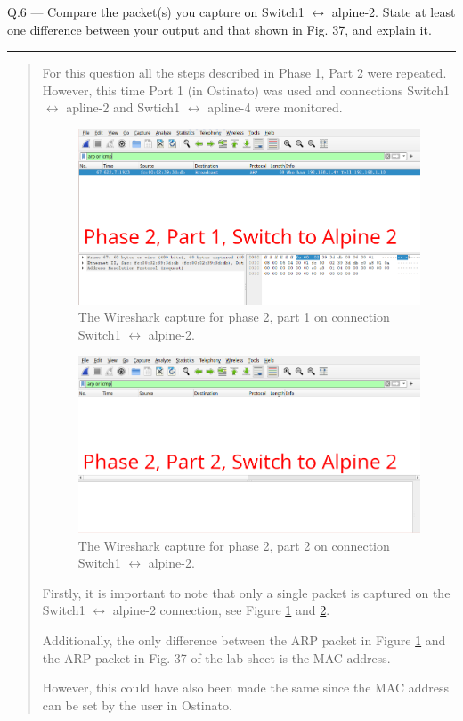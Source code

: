 \documentclass{article}
\newcommand\Que[2]{%
\begin{samepage}
\leavevmode\par
\noindent
Q.#1 --- #2\par\vspace{10pt}\hrule\vspace{10pt}
\end{samepage}}
\newenvironment{ans}
{\fbox{Answer}\begin{quote}\nopagebreak}
{\end{quote}}
\begin{document}
\Que{6}{Compare the packet(s) you capture on Switch1
$\leftrightarrow$ alpine-2. State at least one difference
between your output and that shown in Fig. 37, and explain it.}

\begin{ans}
For this question all the steps described in Phase 1,
Part 2 were repeated. However, this time Port 1 (in
Ostinato) was used and connections Switch1
$\leftrightarrow$ apline-2 and Swtich1 $\leftrightarrow$
apline-4 were monitored.

\begin{figure}[H]
\centering
\includegraphics[width=14cm]{data/q6-phase2-switch-to-alpine2-part1.png}
\caption{The Wireshark capture for phase 2, part 1 on connection Switch1 $\leftrightarrow$ alpine-2.}
\label{fig:wireshark-phase2-part1-for-q6}
\end{figure}

\begin{figure}[H]
\centering
\includegraphics[width=14cm]{data/q6-phase2-switch-to-alpine2-part2.png}
\caption{The Wireshark capture for phase 2, part 2 on connection Switch1 $\leftrightarrow$ alpine-2.}
\label{fig:wireshark-phase2-part2-for-q6}
\end{figure}

Firstly, it is important to note that only a single packet
is captured on the Switch1 $\leftrightarrow$ alpine-2
connection, see Figure
\ref{fig:wireshark-phase2-part1-for-q6} and
\ref{fig:wireshark-phase2-part2-for-q6}.

Additionally, the only difference between the ARP packet in
Figure \ref{fig:wireshark-phase2-part1-for-q6} and the ARP
packet in Fig. 37 of the lab sheet is the MAC address.

However, this could have also been made the same since the
MAC address can be set by the user in Ostinato.
\end{ans}
\end{document}
